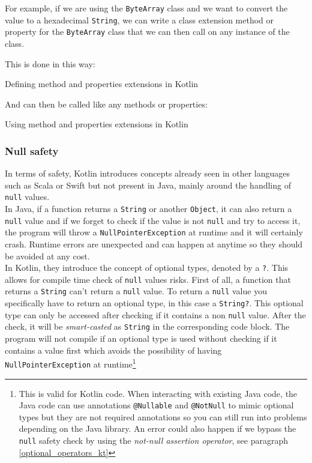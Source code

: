 \documentclass[twoside, openright,11pt,a4paper]{book}
\newenvironment{code}{\captionsetup{type=listing}}{}
\begin{document}
For example, if we are using the \verb+ByteArray+ class and we want to convert the value to a hexadecimal \verb+String+, we can write a class extension method or property for the \verb+ByteArray+ class that we can then call on any instance of the class.

This is done in this way:
\begin{code}
\caption{Defining method and properties extensions in Kotlin}	
\end{code}


And can then be called like any methods or properties:
\begin{code}
\caption{Using method and properties extensions in Kotlin}	
\end{code}

\subsubsection{Null safety}
In terms of safety, Kotlin introduces concepts already seen in other languages such as Scala or Swift but not present in Java, mainly around the handling of \texttt{null} values\cite{kotlin:doc:null}.\\

In Java, if a function returns a \texttt{String} or another \texttt{Object}, it can also return a \texttt{null} value and if we forget to check if the value is not \texttt{null} and try to access it, the program will throw a \texttt{NullPointerException} at runtime and it will certainly crash. Runtime errors are unexpected and can happen at anytime so they should be avoided at any cost. \\

In Kotlin, they introduce the concept of optional types, denoted by a \verb+?+. This allows for compile time check of \texttt{null} values risks. First of all, a function that returns a \texttt{String} can't return a \texttt{null} value. To return a \texttt{null} value you specifically have to return an optional type, in this case a \texttt{String?}. This optional type can only be accessed after checking if it contains a non \texttt{null} value. After the check, it will be \emph{smart-casted} as \texttt{String} in the corresponding code block. The program will not compile if an optional type is used without checking if it contains a value first which avoids the possibility of having \texttt{NullPointerException} at runtime\footnote{This is valid for Kotlin code. When interacting with existing Java code, the Java code can use annotations \texttt{@Nullable} and \texttt{@NotNull} to mimic optional types but they are not required annotations so you can still run into problems depending on the Java library. An error could also happen if we bypass the \texttt{null} safety check by using the \emph{not-null assertion operator}, see paragraph \ref{optional_operators_kt}} \\
\end{document}
